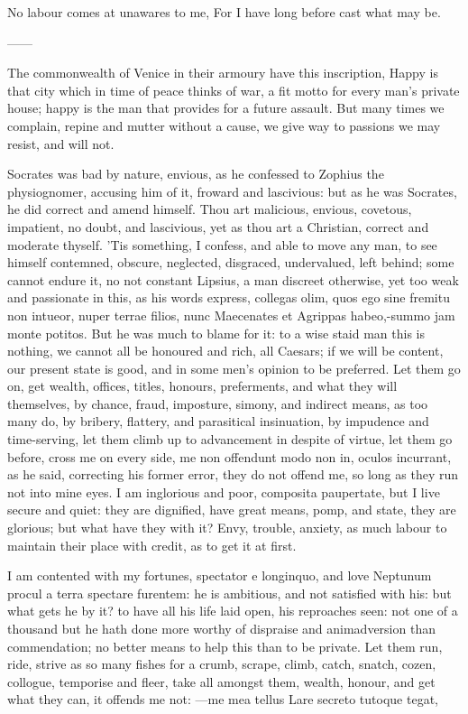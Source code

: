 {No labour comes at unawares to me,
For I have long before cast what may be.

------

The commonwealth of Venice in their armoury have this
inscription, Happy is that city which in time of peace thinks of war, a
fit motto for every man's private house; happy is the man that provides
for a future assault. But many times we complain, repine and mutter
without a cause, we give way to passions we may resist, and will not.

Socrates was bad by nature, envious, as he confessed to Zophius the
physiognomer, accusing him of it, froward and lascivious: but as he was
Socrates, he did correct and amend himself. Thou art malicious,
envious, covetous, impatient, no doubt, and lascivious, yet as thou art
a Christian, correct and moderate thyself. 'Tis something, I confess,
and able to move any man, to see himself contemned, obscure, neglected,
disgraced, undervalued, left behind; some cannot endure it, no
not constant Lipsius, a man discreet otherwise, yet too weak and
passionate in this, as his words express, collegas olim, quos ego
sine fremitu non intueor, nuper terrae filios, nunc Maecenates et
Agrippas habeo,-summo jam monte potitos. But he was much to blame for
it: to a wise staid man this is nothing, we cannot all be honoured and
rich, all Caesars; if we will be content, our present state is good,
and in some men's opinion to be preferred. Let them go on, get wealth,
offices, titles, honours, preferments, and what they will themselves,
by chance, fraud, imposture, simony, and indirect means, as too many
do, by bribery, flattery, and parasitical insinuation, by impudence and
time-serving, let them climb up to advancement in despite of virtue,
let them go before, cross me on every side, me non offendunt modo non
in, oculos incurrant, as he said, correcting his former error,
they do not offend me, so long as they run not into mine eyes. I am
inglorious and poor, composita paupertate, but I live secure and quiet:
they are dignified, have great means, pomp, and state, they are
glorious; but what have they with it? Envy, trouble, anxiety, as
much labour to maintain their place with credit, as to get it at first.

I am contented with my fortunes, spectator e longinquo, and love
Neptunum procul a terra spectare furentem: he is ambitious, and not
satisfied with his: but what gets he by it? to have all his life
laid open, his reproaches seen: not one of a thousand but he hath done
more worthy of dispraise and animadversion than commendation; no better
means to help this than to be private. Let them run, ride, strive as so
many fishes for a crumb, scrape, climb, catch, snatch, cozen, collogue,
temporise and fleer, take all amongst them, wealth, honour, and
get what they can, it offends me not:
---me mea tellus
Lare secreto tutoque tegat,

}

